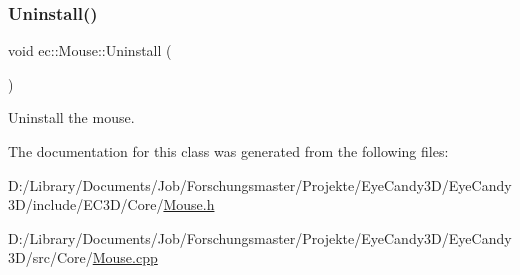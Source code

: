 \subsubsection{\texorpdfstring{Uninstall()}{Uninstall()}}
{\footnotesize\ttfamily void ec\+::\+Mouse\+::\+Uninstall (\begin{DoxyParamCaption}{ }\end{DoxyParamCaption})}

Uninstall the mouse. 

The documentation for this class was generated from the following files\+:\begin{DoxyCompactItemize}
\item 
D\+:/\+Library/\+Documents/\+Job/\+Forschungsmaster/\+Projekte/\+Eye\+Candy3\+D/\+Eye\+Candy3\+D/include/\+E\+C3\+D/\+Core/\mbox{\hyperlink{_mouse_8h}{Mouse.\+h}}\item 
D\+:/\+Library/\+Documents/\+Job/\+Forschungsmaster/\+Projekte/\+Eye\+Candy3\+D/\+Eye\+Candy3\+D/src/\+Core/\mbox{\hyperlink{_mouse_8cpp}{Mouse.\+cpp}}\end{DoxyCompactItemize}

